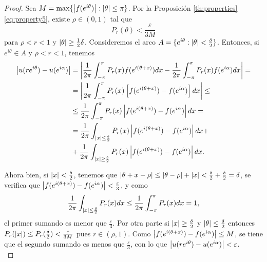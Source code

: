 \begin{proof}
    Sea $M = \max \{ \left\lvert f(e^{i \theta})\right\rvert : \left\lvert\theta\right\rvert \leq \pi \}$. Por la Proposición \ref{th:properties} \eqref{eq:property5}, existe $\rho \in (0,1)$ tal que
    \begin{equation*}
        P_r(\theta) < \frac{\varepsilon}{3 M}
    \end{equation*}
    para $\rho < r < 1$ y $\left\lvert\theta\right\rvert \geq \frac{1}{2} \delta$. Consideremos el arco $A = \{ e^{i \theta} : \left\lvert\theta\right\rvert < \frac{\delta}{2}\}$. Entonces, si $e^{i \theta} \in A$ y $\rho < r < 1$, tenemos
    \begin{equation*}
        \begin{split}
            \left\lvert u(re^{i \theta}) - u(e^{i \alpha})\right\rvert
            & = \left\lvert \dfrac{1}{2 \pi} \int_{- \pi}^{\pi} P_r (x) f(e^{i (\theta + x)}) dx -  \dfrac{1}{2 \pi} \int_{- \pi}^{\pi} P_r (x) f(e^{i \alpha}) dx \right\rvert = \\
            & = \left\lvert \dfrac{1}{2 \pi} \int_{- \pi}^{\pi} P_r (x) \left[f(e^{i (\theta + x)}) - f(e^{i \alpha}) \right] dx\right\rvert \leq \\
            & \leq \dfrac{1}{2 \pi} \int_{- \pi}^{\pi} P_r (x) \left\lvert f(e^{i (\theta + x)}) - f(e^{i \alpha})\right\rvert dx = \\
            & = \dfrac{1}{2 \pi} \int_{\left\lvert x\right\rvert \leq \frac{\delta}{2}} P_r (x) \left\lvert f(e^{i (\theta + x)}) - f(e^{i \alpha})\right\rvert dx + \\
            & + \dfrac{1}{2 \pi} \int_{\left\lvert x\right\rvert \geq \frac{\delta}{2}} P_r (x) \left\lvert f(e^{i (\theta + x)}) - f(e^{i \alpha})\right\rvert dx.
        \end{split}
    \end{equation*}

    Ahora bien, si $\left\lvert x\right\rvert < \frac{\delta}{2}$, tenemos que $\left\lvert\theta + x - \rho\right\rvert \leq \left\lvert\theta - \rho\right\rvert + \left\lvert x\right\rvert < \frac{\delta}{2} + \frac{\delta}{2} = \delta$, se verifica que $\left\lvert f(e^{i (\theta + x)}) - f(e^{i \alpha})\right\rvert < \frac{\varepsilon}{3}$, y como
    \begin{equation*}
        \dfrac{1}{2 \pi} \int_{\left\lvert x\right\rvert \leq \frac{\delta}{2}} P_r (x) dx \leq \dfrac{1}{2 \pi} \int_{-\pi}^{\pi} P_r (x) dx = 1,
    \end{equation*}
    el primer sumando es menor que $\frac{\varepsilon}{3}$. Por otra parte si $\left\lvert x\right\rvert \geq \frac{\delta}{2}$ y $\left\lvert\theta\right\rvert \leq \frac{\delta}{2}$ entonces $P_r(\left\lvert x\right\rvert) \leq P_r(\frac{\delta}{2}) < \frac{\varepsilon}{3M}$ pues $r \in (\rho, 1).$ Como $\left\lvert f(e^{i (\theta + x)}) - f(e^{i \alpha})\right\rvert \leq M$, se tiene que el segundo sumando es menos que $\frac{\varepsilon}{3}$, con lo que $\left\lvert u(re^{i \theta}) - u(e^{i \alpha})\right\rvert < \varepsilon$. \\


\end{proof}
